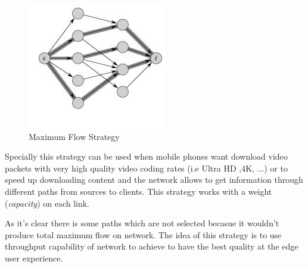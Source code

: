 \begin{figure}[H]

\begin{center}

\includegraphics[scale = 0.8]{Pictures/max.jpg}

\caption{Maximum Flow Strategy} \label{max} 

\end{center}

\end{figure}


 
Specially this strategy can be used when mobile phones want download video packets with very high quality video coding rates (i.e Ultra HD ,4K, ...) or to speed up downloading content and the network allows to get information through different paths from sources to clients. This strategy works with a weight (\textit{capacity}) on each link.

As it's clear there is some paths which are not selected becasue it wouldn't produce total maximum flow on network.  The idea of this strategy is to use throughput capability of network to achieve to have the best quality at the edge user experience. 







